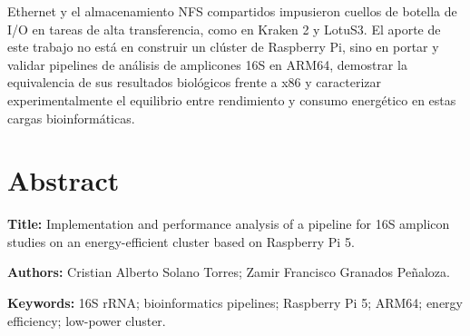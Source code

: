 \documentclass[12pt,oneside,spanish]{book}
\begin{document}
Ethernet y el almacenamiento NFS compartidos impusieron cuellos de botella de I/O en tareas de alta transferencia, como en Kraken 2 y LotuS3. El aporte de este trabajo no está en construir un clúster de Raspberry Pi, sino en portar y validar pipelines de análisis de amplicones 16S en ARM64, demostrar la equivalencia de sus resultados biológicos frente a x86 y caracterizar experimentalmente el equilibrio entre rendimiento y consumo energético en estas cargas bioinformáticas.
    
    
    
    \chapter*{Abstract}
    
    \vspace{1cm}
    
    \noindent\textbf{Title:} Implementation and performance analysis of a pipeline for 16S amplicon studies on an energy-efficient cluster based on Raspberry Pi 5.
    
    \medskip
    
    \noindent\textbf{Authors:} Cristian Alberto Solano Torres; Zamir Francisco Granados Peñaloza.
    
    \medskip
    
    \noindent\textbf{Keywords:} 16S rRNA; bioinformatics pipelines; Raspberry Pi 5; ARM64; energy efficiency; low-power cluster.
    
    \vspace{0.5cm}
    
\end{document}
